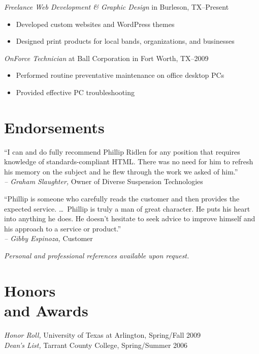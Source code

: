 \documentclass[margin]{res}
\begin{document}
\begin{resume}
                \textit{Freelance Web Development \textrm{\&} Graphic Design}
                in Burleson, TX--Present
                \begin{itemize} \itemsep -2pt %
                  \item Developed custom websites and WordPress themes
                  \item Designed print products for local bands, organizations, and businesses
                \end{itemize}
                
                \textit{OnForce Technician}
                at Ball Corporation in Fort Worth, TX--2009
                \begin{itemize} \itemsep -2pt %
                  \item Performed routine preventative maintenance on office desktop PCs
                  \item Provided effective PC troubleshooting
                \end{itemize}

      
\section{\textsf{Endorsements}}

                ``I can and do fully recommend Phillip Ridlen for any position that requires 
                knowledge of standards-compliant HTML. There was no need for him to refresh his 
                memory on the subject and he flew through the work we asked of him.''             \\
                \textit{-- Graham Slaughter,} Owner of Diverse Suspension Technologies

                ``Phillip is someone who carefully reads the customer and then 
                provides the expected service. \ldots \ Phillip is truly a man of great character. 
                He puts his heart into anything he does. He doesn't hesitate to seek advice 
                to improve himself and his approach to a service or product.''                    \\
                \textit{-- Gibby Espinoza,} Customer
                
                \textit{Personal and professional references available upon request.}


\section{\textsf{Honors \\and Awards}}
                
                \textit{Honor Roll,} University of Texas at Arlington, Spring/Fall 2009 \\
                \textit{Dean's List,} Tarrant County College, Spring/Summer 2006
                
\end{resume}
\end{document}
